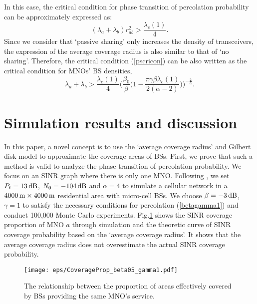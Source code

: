 \documentclass[final]{IEEEtran}
\begin{document}
In this case, the critical condition for phase transition of percolation probability can be approximately expressed as:
\begin{equation}\label{pscricon}
    (\lambda_a+\lambda_b)r_{ab}^2>\frac{\lambda_c(1)}{4}.
\end{equation}
\indent Since we consider that `passive sharing' only increases the density of transceivers, the expression of the average coverage radius is also similar to that of `no sharing'. Therefore, the critical condition (\ref{pscricon}) can be also written as the critical condition for MNOs' BS densities, \ie
\begin{equation}
    \lambda_a+\lambda_b>\frac{\lambda_c(1)}{4}\bigg(\frac{\beta_0}{\beta}\bigg(1-\frac{\pi \gamma \beta\lambda_c(1)}{2(\alpha-2)}\bigg)\bigg)^{-\frac{2}{\alpha}}.
\end{equation}

\section{Simulation results and discussion}\label{sec:simulation}

\indent In this paper, a novel concept is to use the `average coverage radius' and Gilbert disk model to approximate the coverage areas of BSs. First, we prove that such a method is valid to analyze the phase transition of percolation probability. We focus on an SINR graph where there is only one MNO. Following \cite{kouzayha2022coexisting,isabona2023accurate,kumari2019short}, we set $P_t=13 {\rm\,dB}$, $N_0=-104\,{\rm dB}$ and $\alpha=4$ to simulate a cellular network in a $4000\,{\rm m}\times 4000\,{\rm m}$ residential area with micro-cell BSs. We choose $\beta=-3\,{\rm dB}$, $\gamma=1$ to satisfy the necessary conditions for percolation (\ref{betagamma1}) and conduct 100,000 Monte Carlo experiments.  
Fig.\ref{fig:Covpro} shows the SINR coverage proportion of MNO $a$ through simulation and the theoretic curve of SINR coverage probability based on the `average coverage radius'. It shows that the average coverage radius does not overestimate the actual SINR coverage probability.

\begin{figure}[ht]
    \centering
    \texttt{[image: eps/CoverageProp\_beta05\_gamma1.pdf]}
    \caption{The relationship between the proportion of areas effectively covered by BSs providing the same MNO's service.}
    \label{fig:Covpro}
\end{figure}
\end{document}
